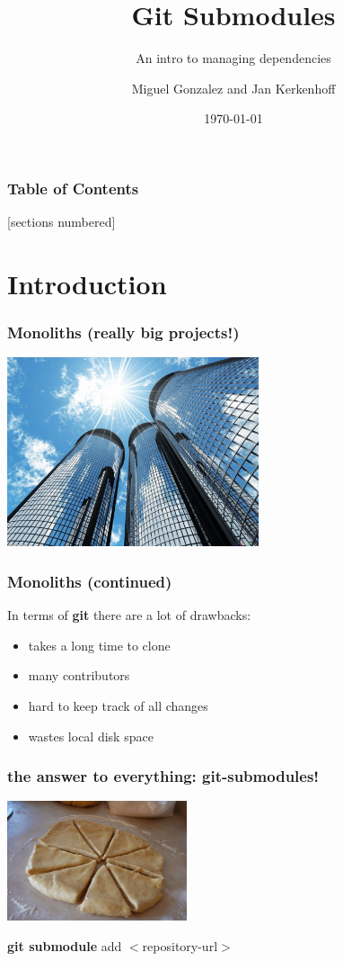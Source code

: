 \documentclass[10pt]{beamer}
\title{Git Submodules}
\subtitle{An intro to managing dependencies}
\date{\today}
\author{Miguel Gonzalez and Jan Kerkenhoff}
\institute{Fontys Hogeschool Venlo}
\begin{document}
\maketitle

\begin{frame}
  \frametitle{Table of Contents}
  [sections numbered]
  \tableofcontents[hideallsubsections]
\end{frame}


\section{Introduction}

\begin{frame}
  \frametitle{Monoliths (really big projects!)}
  \begin{center}\includegraphics[width=280px]{images/monoliths.jpg}\end{center}
\end{frame}

\begin{frame}
  \frametitle{Monoliths (continued)}
  In terms of \textbf{git} there are a lot of drawbacks:
  \begin{itemize}
  	\item takes a long time to clone
  	\item many contributors
  	\item hard to keep track of all changes
  	\item wastes local disk space
  \end{itemize}  
\end{frame}

\begin{frame}
  \frametitle{the answer to everything: git-submodules!}
  \begin{center}\includegraphics[width=200px]{images/divide.jpg}\end{center}
  \begin{center}\textbf{git submodule }add $<$repository-url$>$\end{center}
\end{frame}
\end{document}
